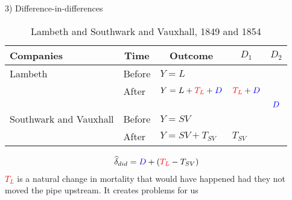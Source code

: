 \documentclass{beamer}
\begin{document}
\begin{frame}{3) Difference-in-differences}

\begin{table}\centering
		\caption{Lambeth and Southwark and Vauxhall, 1849 and 1854}
		\begin{center}
		\begin{tabular}{lll|lc}
		\toprule
		\multicolumn{1}{l}{\textbf{Companies}}&
		\multicolumn{1}{c}{\textbf{Time}}&
		\multicolumn{1}{c}{\textbf{Outcome}}&
		\multicolumn{1}{c}{$D_1$}&
		\multicolumn{1}{c}{$D_2$}\\
		\midrule
		Lambeth & Before & $Y=L$ \\
		& After & $Y=L + \textcolor{red}{T_L} + \textcolor{blue}{D}$ & $\textcolor{red}{T_L}+\textcolor{blue}{D}$\\
		\midrule
		& & & & $\textcolor{blue}{D}$ \\
		\midrule
		Southwark and Vauxhall & Before & $Y=SV$ \\
		& After & $Y=SV + T_{SV}$ & $T_{SV}$\\
		\bottomrule
		\end{tabular}
		\end{center}
	\end{table}

\begin{eqnarray*}
\widehat{\delta}_{did} = \textcolor{blue}{D} + (\textcolor{red}{T_L} - T_{SV})
\end{eqnarray*}\textcolor{red}{$T_L$} is a natural change in mortality that would have happened had they not moved the pipe upstream.  It creates problems for us

\end{frame}
\end{document}
